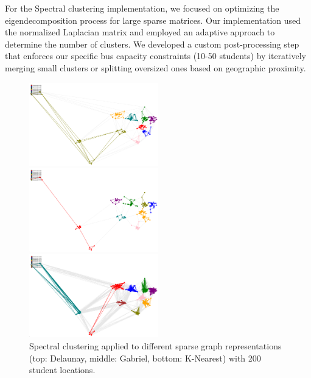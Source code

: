 For the Spectral clustering implementation, we focused on optimizing the eigendecomposition process for large sparse matrices. Our implementation used the normalized Laplacian matrix and employed an adaptive approach to determine the number of clusters. We developed a custom post-processing step that enforces our specific bus capacity constraints (10-50 students) by iteratively merging small clusters or splitting oversized ones based on geographic proximity.

\begin{figure}[htbp]
\centering
\includegraphics[width=0.5\textwidth]{./img/Spectral_Delaunay}
\vspace{0.5cm}

\includegraphics[width=0.5\textwidth]{./img/Spectral_Gabriel}
\vspace{0.5cm}

\includegraphics[width=0.5\textwidth]{./img/Spectral_K}

\caption{Spectral clustering applied to different sparse graph representations (top: Delaunay, middle: Gabriel, bottom: K-Nearest) with 200 student locations.}
\label{fig:spectral_clustering}
\end{figure}

